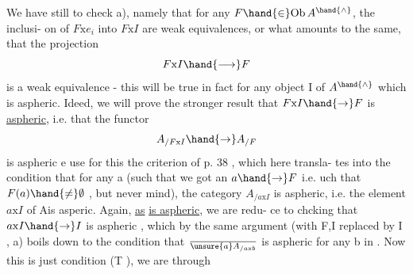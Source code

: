 We have still to check a), namely that for any $F\hand{\in} \mathrm{Ob}\, A^{\hand{\wedge}}$, the inclusi-%
on of  $F\mathrm{x} e_i$\hand{\unsure{,}} into $F\mathrm{x} I$ are weak equivalences, or what amounts to the same,
that the projection
\[ F\mathrm{x} I \hand{\longrightarrow} F \]
is a weak equivalence - this will be true in fact for any object I of $A^{\hand{\wedge}}$
which is aspheric. Ideed, we will prove the stronger result that
$F\mathrm{x} I \hand{\to} F$ is \uline{aspheric}, i.e. that the functor
\[ A_{/F\mathrm{x} I} \hand{\to} A_{/F} \]
is aspheric e use for this the criterion of p. 38 , which here transla-%
tes into the condition that for any a  (such that we got an $a\hand{\to} F$ i.e. uch
that $F(a) \hand{\neq} \emptyset$ , but never mind), the category $A_{/a\mathrm{x} I}$ is aspheric, i.e.
the element $a\mathrm{x} I$ of A\hand{$^\wedge$}is asperic. Again, \uline{as}  \uline{is aspheric}, we are redu-%
ce to chcking that $a\mathrm{x} I \hand{\to} I$ is aspheric , which by the same argument
(with F,I replaced by I , a) boils down to the condition that $\over{\unsure{a}}{A}_{/a\mathrm{x} b}$ is
aspheric for any b in . Now this is just condition (T ), we are through\hand{!}
